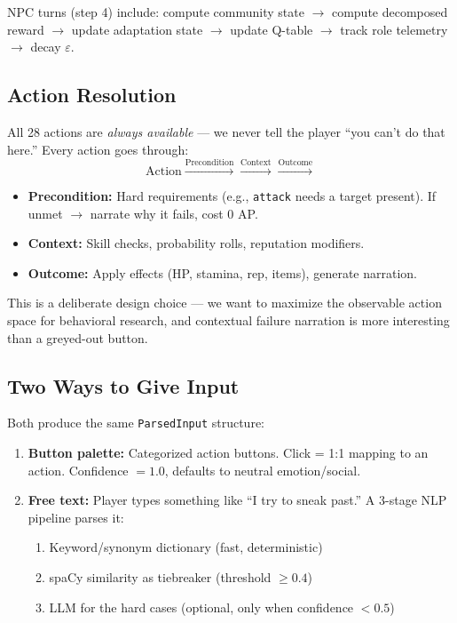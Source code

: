 NPC turns (step 4) include: compute community state $\to$ compute decomposed reward $\to$ update adaptation state $\to$ update Q-table $\to$ track role telemetry $\to$ decay $\varepsilon$.

\subsection{Action Resolution}

All 28 actions are \emph{always available} --- we never tell the player ``you can't do that here.'' Every action goes through:
$$\text{Action} \xrightarrow{\text{Precondition}} \xrightarrow{\text{Context}} \xrightarrow{\text{Outcome}}$$

\begin{itemize}
    \item \textbf{Precondition:} Hard requirements (e.g., \texttt{attack} needs a target present). If unmet $\to$ narrate why it fails, cost 0 AP.
    \item \textbf{Context:} Skill checks, probability rolls, reputation modifiers.
    \item \textbf{Outcome:} Apply effects (HP, stamina, rep, items), generate narration.
\end{itemize}

This is a deliberate design choice --- we want to maximize the observable action space for behavioral research, and contextual failure narration is more interesting than a greyed-out button.

\subsection{Two Ways to Give Input}

Both produce the same \texttt{ParsedInput} structure:

\begin{enumerate}
    \item \textbf{Button palette:} Categorized action buttons. Click = 1:1 mapping to an action. Confidence $= 1.0$, defaults to neutral emotion/social.
    \item \textbf{Free text:} Player types something like ``I try to sneak past.'' A 3-stage NLP pipeline parses it:
    \begin{enumerate}[label=(\alph*)]
        \item Keyword/synonym dictionary (fast, deterministic)
        \item spaCy similarity as tiebreaker (threshold $\geq 0.4$)
        \item LLM for the hard cases (optional, only when confidence $< 0.5$)
    \end{enumerate}
\end{enumerate}

